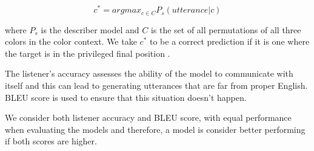 \[c^{*} = argmax_{c \in C} P_{s} (utterance | c)\]

\par
where \(P_{s}\) is the describer model and \(C\) is the set of all permutations of all three colors in the color context. We take \(c^{*}\) to be a correct prediction if it is one where the target is in the privileged final position \citep{potts-2020-colors}.

\par
The listener's accuracy assesses the ability of the model to communicate with itself and this can lead to generating utterances that are far from proper English. BLEU score is used to ensure that this situation doesn’t happen.

\par
We consider both listener accuracy and BLEU score, with equal performance when evaluating the models and therefore, a model is consider better performing if both scores are higher.




